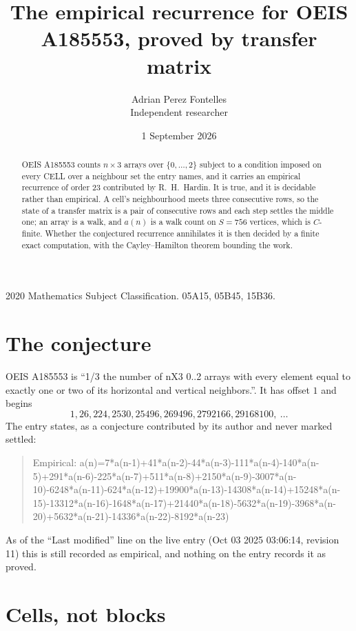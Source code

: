 \documentclass[11pt,a4paper]{article}
\title{The empirical recurrence for OEIS A185553, proved by transfer matrix}
\author{Adrian Perez Fontelles\\ \small Independent researcher}
\date{1 September 2026}
\theoremstyle{plain}
\theoremstyle{definition}
\begin{document}
\maketitle

\begin{abstract}
OEIS A185553 counts $n\times3$ arrays over $\{0,\dots,2\}$ subject to a condition imposed on
every CELL over a neighbour set the entry names, and it carries an empirical recurrence of
order $23$ contributed by R.~H.~Hardin. It is true, and it is decidable rather than
empirical. A cell's neighbourhood meets three consecutive rows, so the state of a transfer
matrix is a pair of consecutive rows and each step settles the middle one; an array is a
walk, and $a(n)$ is a walk count on $S=756$ vertices, which is $C$-finite. Whether the
conjectured recurrence annihilates it is then decided by a finite exact computation, with the
Cayley--Hamilton theorem bounding the work.
\end{abstract}

\noindent\small 2020 Mathematics Subject Classification. 05A15, 05B45, 15B36.\normalsize

\section{The conjecture}

OEIS A185553 is ``1/3 the number of nX3 0..2 arrays with every element equal to exactly one or two of its horizontal and vertical neighbors.''. It has offset $1$ and begins
\[
1, 26, 224, 2530, 25496, 269496, 2792166, 29168100,\ \dots
\]
The entry states, as a conjecture contributed by its author and never marked settled:
\begin{quote}
Empirical: a(n)=7*a(n-1)+41*a(n-2)-44*a(n-3)-111*a(n-4)-140*a(n-5)+291*a(n-6)-225*a(n-7)+511*a(n-8)+2150*a(n-9)-3007*a(n-10)-6248*a(n-11)-624*a(n-12)+19900*a(n-13)-14308*a(n-14)+15248*a(n-15)-13312*a(n-16)-1648*a(n-17)+21440*a(n-18)-5632*a(n-19)-3968*a(n-20)+5632*a(n-21)-14336*a(n-22)-8192*a(n-23)
\end{quote}
As of the ``Last modified'' line on the live entry (Oct 03 2025 03:06:14, revision 11) this is still
recorded as empirical, and nothing on the entry records it as proved.

\section{Cells, not blocks}
\end{document}
